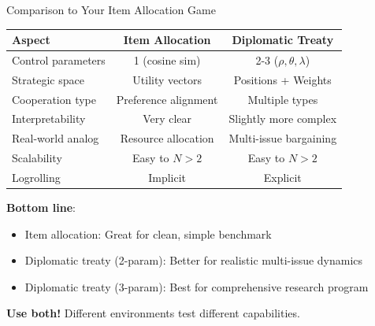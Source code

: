 \documentclass{beamer}
\begin{document}
\begin{frame}{Comparison to Your Item Allocation Game}
\begin{center}
\begin{tabular}{lcc}
\hline
\textbf{Aspect} & \textbf{Item Allocation} & \textbf{Diplomatic Treaty} \\
\hline
Control parameters & 1 (cosine sim) & 2-3 ($\rho, \theta, \lambda$) \\
Strategic space & Utility vectors & Positions + Weights \\
Cooperation type & Preference alignment & Multiple types \\
Interpretability & Very clear & Slightly more complex \\
Real-world analog & Resource allocation & Multi-issue bargaining \\
Scalability & Easy to $N > 2$ & Easy to $N > 2$ \\
Logrolling & Implicit & Explicit \\
\hline
\end{tabular}
\end{center}

\vspace{0.5cm}

\textbf{Bottom line}:
\begin{itemize}
    \item Item allocation: Great for clean, simple benchmark
    \item Diplomatic treaty (2-param): Better for realistic multi-issue dynamics
    \item Diplomatic treaty (3-param): Best for comprehensive research program
\end{itemize}

\textbf{Use both!} Different environments test different capabilities.
\end{frame}
\end{document}
